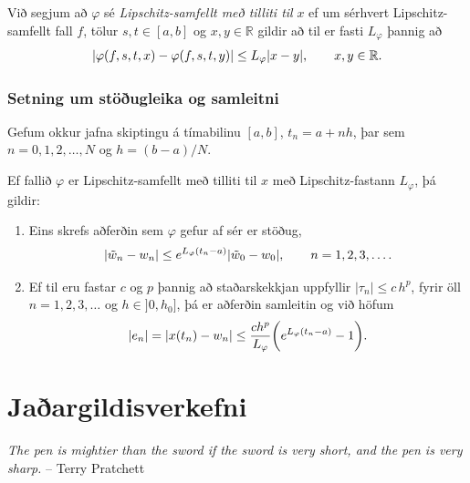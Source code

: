 \documentclass[letterpaper,10pt,icelandic]{sphinxmanual}
\begin{document}
Við segjum að \(\varphi\) sé \emph{Lipschitz-samfellt með tilliti til}
\(x\) ef um sérhvert Lipschitz-samfellt fall \(f\), tölur
\(s,t\in [a,b]\) og \(x,y\in {{\mathbb  R}}\) gildir að til er
fasti \(L_\varphi\) þannig að
\begin{gather}
\begin{split}|\varphi(f,s,t,x)-\varphi(f,s,t,y)|\leq L_\varphi|x-y|, \qquad x,y\in {{\mathbb  R}}.\end{split}\notag
\end{gather}

\subsection{Setning um stöðugleika og samleitni}
\label{kafli06:setning-um-stougleika-og-samleitni}
Gefum okkur jafna skiptingu á tímabilinu \([a,b]\),
\(t_n=a+nh\), þar sem \(n=0,1,2,\dots,N\) og \(h=(b-a)/N\).

Ef fallið \(\varphi\) er Lipschitz-samfellt með tilliti til
\(x\) með Lipschitz-fastann \(L_\varphi\), þá gildir:
\begin{enumerate}
\item {} 
Eins skrefs aðferðin sem \(\varphi\) gefur af sér er stöðug,
\begin{gather}
\begin{split}|\tilde w_n-w_n|\leq e^{L_\varphi(t_n-a)}|\tilde w_0-w_0|, \qquad
n=1,2,3,\dots.\end{split}\notag
\end{gather}
\item {} 
Ef til eru fastar \(c\) og \(p\) þannig að staðarskekkjan
uppfyllir \(|\tau_n|\leq c\, h^p\), fyrir öll
\(n=1,2,3,\dots\) og \(h\in ]0,h_0]\), þá er aðferðin
samleitin og við höfum
\begin{gather}
\begin{split}|e_n|=|x(t_n)-w_n|\leq \dfrac{ch^p}{L_\varphi}
\bigg(e^{L_\varphi(t_n-a)}-1\bigg).\end{split}\notag
\end{gather}
\end{enumerate}


\chapter{Jaðargildisverkefni}
\label{kafli07::doc}\label{kafli07:index-0}\label{kafli07:jaargildisverkefni}
\emph{The pen is mightier than the sword if the sword is very short, and the pen is very sharp.}
-- Terry Pratchett
\end{document}
